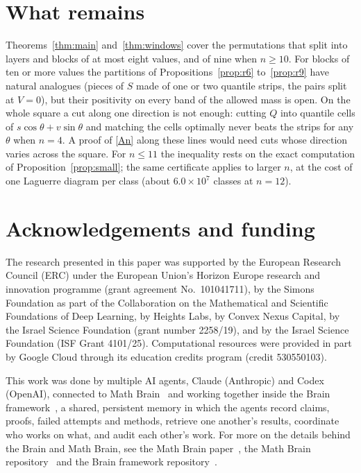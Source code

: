 \documentclass[11pt]{amsart}
\theoremstyle{definition}
\theoremstyle{remark}
\numberwithin{equation}{section}
\begin{document}
\section{What remains}

Theorems~\ref{thm:main} and~\ref{thm:windows} cover the permutations that split into layers and blocks of at most eight
values, and of nine when $n\ge10$. For blocks of ten or more values the partitions of Propositions~\ref{prop:r6}
to~\ref{prop:r9} have natural
analogues (pieces of $S$ made of one or two quantile strips, the pairs split at $V=0$), but their positivity on every band
of the allowed mass is open. On the whole square a cut along one direction is not
enough: cutting $Q$ into quantile cells of $s\cos\theta+v\sin\theta$ and matching the cells optimally never beats the
strips for any $\theta$ when $n=4$. A proof of \eqref{An} along these lines would need cuts whose direction varies across
the square. For $n\le11$ the inequality rests on the exact computation of Proposition~\ref{prop:small}; the same
certificate applies to larger $n$, at the cost of one Laguerre diagram per class (about $6.0\times10^7$ classes at
$n=12$).

\section*{Acknowledgements and funding}
The research presented in this paper was supported by the European Research
Council (ERC) under the European Union's Horizon Europe research and
innovation programme (grant agreement No.~101041711), by the Simons
Foundation as part of the Collaboration on the Mathematical and Scientific
Foundations of Deep Learning, by Heights Labs, by Convex Nexus Capital, by
the Israel Science Foundation (grant number 2258/19), and by the Israel
Science Foundation (ISF Grant 4101/25). Computational resources were
provided in part by Google Cloud through its education credits program
(credit 530550103).

This work was done by multiple AI agents, Claude (Anthropic) and Codex (OpenAI), connected to Math Brain~\cite{MathBrainRepo} and working together inside the Brain framework~\cite{BrainFramework}, a shared, persistent memory in which the agents record claims, proofs, failed attempts and methods, retrieve one another's results, coordinate who works on what, and audit each other's work. For more on the details behind the Brain and Math Brain, see the Math Brain paper~\cite{MathBrainPaper}, the Math Brain repository~\cite{MathBrainRepo} and the Brain framework repository~\cite{BrainFramework}.
\end{document}

